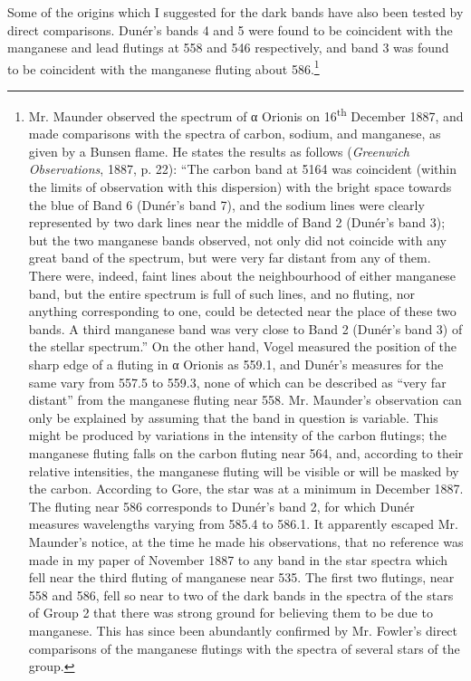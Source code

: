 \documentclass[a4paper, 12pt, oneside, polutonikogreek, english]{article}
\begin{document}
Some of the origins which I suggested for the dark bands have also been tested by direct comparisons. Dunér's bands 4 and 5 were found to be coincident with the manganese and lead flutings at 558 and 546 respectively, and band 3 was found to be coincident with the manganese fluting about 586.\footnote{Mr. Maunder observed the spectrum of α Orionis on 16\textsuperscript{th} December 1887, and made comparisons with the spectra of carbon, sodium, and manganese, as given by a Bunsen flame. He states the results as follows (\emph{Greenwich Observations}, 1887, p. 22): ``The carbon band at 5164 was coincident (within the limits of observation with this dispersion) with the bright space towards the blue of Band 6 (Dunér's band 7), and the sodium lines were clearly represented by two dark lines near the middle of Band 2 (Dunér's band 3); but the two manganese bands observed, not only did not coincide with any great band of the spectrum, but were very far distant from any of them. There were, indeed, faint lines about the neighbourhood of either manganese band, but the entire spectrum is full of such lines, and no fluting, nor anything corresponding to one, could be detected near the place of these two bands. A third manganese band was very close to Band 2 (Dunér's band 3) of the stellar spectrum.'' On the other hand, Vogel measured the position of the sharp edge of a fluting in α Orionis as 559.1, and Dunér's measures for the same vary from 557.5 to 559.3, none of which can be described as ``very far distant'' from the manganese fluting near 558. Mr. Maunder's observation can only be explained by assuming that the band in question is variable. This might be produced by variations in the intensity of the carbon flutings; the manganese fluting falls on the carbon fluting near 564, and, according to their relative intensities, the manganese fluting will be visible or will be masked by the carbon. According to Gore, the star was at a minimum in December 1887. The fluting near 586 corresponds to Dunér's band 2, for which Dunér measures wavelengths varying from 585.4 to 586.1. It apparently escaped Mr. Maunder's notice, at the time he made his observations, that no reference was made in my paper of November 1887 to any band in the star spectra which fell near the third fluting of manganese near 535. The first two flutings, near 558 and 586, fell so near to two of the dark bands in the spectra of the stars of Group 2 that there was strong ground for believing them to be due to manganese. This has since been abundantly confirmed by Mr. Fowler's direct comparisons of the manganese flutings with the spectra of several stars of the group.}
\end{document}
